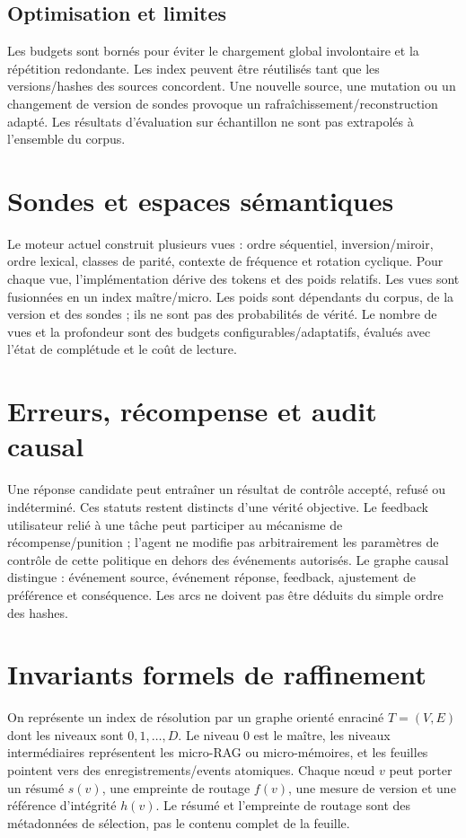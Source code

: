 \documentclass[11pt,a4paper]{article}
\begin{document}
\subsection{Optimisation et limites}
Les budgets sont bornés pour éviter le chargement global involontaire et la répétition redondante. Les index peuvent être réutilisés tant que les versions/hashes des sources concordent. Une nouvelle source, une mutation ou un changement de version de sondes provoque un rafraîchissement/reconstruction adapté. Les résultats d'évaluation sur échantillon ne sont pas extrapolés à l'ensemble du corpus.

\section{Sondes et espaces sémantiques}
Le moteur actuel construit plusieurs vues : ordre séquentiel, inversion/miroir, ordre lexical, classes de parité, contexte de fréquence et rotation cyclique. Pour chaque vue, l'implémentation dérive des tokens et des poids relatifs. Les vues sont fusionnées en un index maître/micro. Les poids sont dépendants du corpus, de la version et des sondes ; ils ne sont pas des probabilités de vérité. Le nombre de vues et la profondeur sont des budgets configurables/adaptatifs, évalués avec l'état de complétude et le coût de lecture.

\section{Erreurs, récompense et audit causal}
Une réponse candidate peut entraîner un résultat de contrôle accepté, refusé ou indéterminé. Ces statuts restent distincts d'une vérité objective. Le feedback utilisateur relié à une tâche peut participer au mécanisme de récompense/punition ; l'agent ne modifie pas arbitrairement les paramètres de contrôle de cette politique en dehors des événements autorisés. Le graphe causal distingue : événement source, événement réponse, feedback, ajustement de préférence et conséquence. Les arcs ne doivent pas être déduits du simple ordre des hashes.

\section{Invariants formels de raffinement}
On représente un index de résolution par un graphe orienté enraciné $T=(V,E)$ dont les niveaux sont $0,1,\ldots,D$. Le niveau $0$ est le maître, les niveaux intermédiaires représentent les micro-RAG ou micro-mémoires, et les feuilles pointent vers des enregistrements/events atomiques. Chaque nœud $v$ peut porter un résumé $s(v)$, une empreinte de routage $f(v)$, une mesure de version et une référence d'intégrité $h(v)$. Le résumé et l'empreinte de routage sont des métadonnées de sélection, pas le contenu complet de la feuille.
\end{document}
